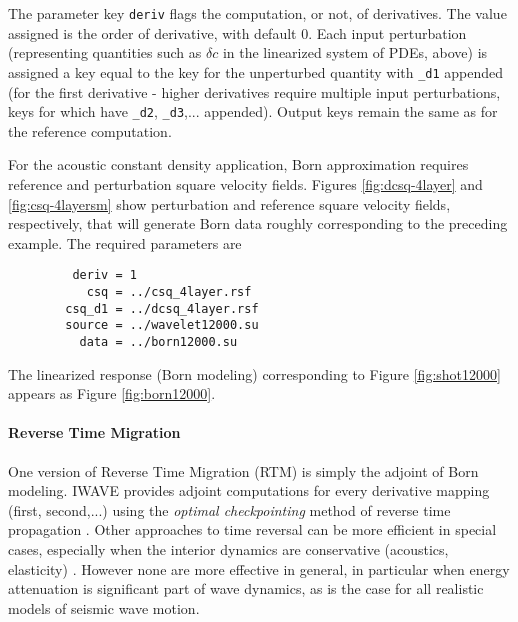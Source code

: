 The parameter key {\tt deriv} flags the computation, or not, of
derivatives. The value assigned is the order of derivative, with
default 0. Each input perturbation (representing quantities such as
$\delta c$ in the linearized system of PDEs, above) is assigned a key
equal to the key for the unperturbed quantity with {\tt \_d1} appended
(for the first derivative - higher derivatives require multiple input
perturbations, keys for which have {\tt \_d2},
{\tt \_d3},... appended). Output keys remain the same as for the reference
computation. 

For the acoustic constant density application, Born approximation
requires reference and perturbation square velocity fields. Figures
\ref{fig:dcsq-4layer} and \ref{fig:csq-4layersm} show perturbation and
reference square velocity fields, respectively, that will generate
Born data roughly corresponding to the preceding example. The required
parameters are
\begin{verbatim}
         deriv = 1
           csq = ../csq_4layer.rsf
        csq_d1 = ../dcsq_4layer.rsf
        source = ../wavelet12000.su
          data = ../born12000.su
\end{verbatim}
The linearized response (Born modeling) corresponding to Figure 
\ref{fig:shot12000} appears as Figure \ref{fig:born12000}.


\noindent \paragraph{Reverse Time Migration}
One version of Reverse Time Migration (RTM) is simply the adjoint of
Born modeling. IWAVE provides adjoint computations for every
derivative mapping (first, second,...) using the {\em optimal
  checkpointing} method of reverse time propagation
\cite[]{Griewank:book,BlanVerSy:95,Plessix:06,Symes:06a-pub}. Other approaches to time reversal can be more efficient in
special cases, especially when the interior dynamics are conservative
(acoustics, elasticity) \cite[]{Dussaud:08,Clapp:09}. However
none are more effective in general, in particular when energy
attenuation is significant part of wave dynamics, as is the case for
all realistic models of seismic wave motion. 

